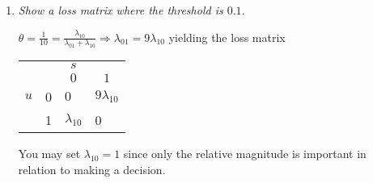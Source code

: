 \begin{example}
\begin{enumerate}
		\item \emph{Show a loss matrix where the threshold is $0.1$.}\newline
		
		$\theta = \frac{1}{10}=\frac{\lambda_{10}}{\lambda_{01}+\lambda_{10}} \Rightarrow \lambda_{01}=9\lambda_{10}$ yielding the loss matrix
		
		\begin{center}
			\begin{tabular}{ c  c  c  c }
				&& $s$& \\
				&& $0$ & $1$  \\
				\cline{3-4}
				$u$ & 0& \multicolumn{1}{|l}{$0$} &\multicolumn{1}{l|}{$9\lambda_{10}$}  \\
				& 1& \multicolumn{1}{|l}{$\lambda_{10}$} & \multicolumn{1}{l|}{0} \\
				\cline{3-4}
			\end{tabular}
		\end{center}
		
		You may set $\lambda_{10}=1$ since only the relative magnitude is important in relation to making a decision.
		
	\end{enumerate}
	
	
\end{example}


